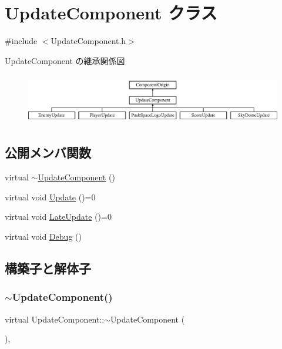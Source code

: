 \hypertarget{class_update_component}{}\section{Update\+Component クラス}
\label{class_update_component}


{\ttfamily \#include $<$Update\+Component.\+h$>$}

Update\+Component の継承関係図\begin{figure}[H]
\begin{center}
\leavevmode
\includegraphics[height=2.225166cm]{class_update_component}
\end{center}
\end{figure}
\subsection*{公開メンバ関数}
\begin{DoxyCompactItemize}
\item 
virtual \mbox{\hyperlink{class_update_component_ad654da84b672a40c916ca362f787e1b4}{$\sim$\+Update\+Component}} ()
\item 
virtual void \mbox{\hyperlink{class_update_component_ade313ad8bf19a81e7d098aa830d9f01b}{Update}} ()=0
\item 
virtual void \mbox{\hyperlink{class_update_component_aecc61593be4d1feff2db4d9ff1f83f9f}{Late\+Update}} ()=0
\item 
virtual void \mbox{\hyperlink{class_update_component_a636b21061765a1101600c3ad70fadeac}{Debug}} ()
\end{DoxyCompactItemize}


\subsection{構築子と解体子}
\mbox{\label{class_update_component_ad654da84b672a40c916ca362f787e1b4}} 
\subsubsection{\texorpdfstring{$\sim$\+Update\+Component()}{~UpdateComponent()}}
{\footnotesize\ttfamily virtual Update\+Component\+::$\sim$\+Update\+Component (\begin{DoxyParamCaption}{ }\end{DoxyParamCaption})\hspace{0.3cm}{\ttfamily [inline]}, {\ttfamily [virtual]}}



